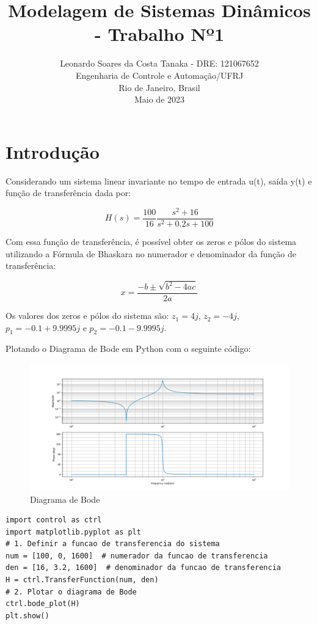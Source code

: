 \documentclass[10pt]{article}
\title{Modelagem de Sistemas Dinâmicos - Trabalho Nº1}
\author{
    Leonardo Soares da Costa Tanaka - DRE: 121067652 \\
    Engenharia de Controle e Automação/UFRJ \\
    Rio de Janeiro, Brasil \\
    Maio de 2023
}
\date{}
\begin{document}
\maketitle
\thispagestyle{capa}

\section{Introdução}

\quad Considerando um sistema linear invariante no tempo de entrada u(t), saída y(t) e 
função de transferência dada por:

\begin{equation}
    H(s) = \frac{100}{16} \frac{s^2 + 16}{s^2 + 0.2s + 100}
\end{equation}

\quad Com essa função de transferência,
é possível obter os zeros e pólos do sistema utilizando a Fórmula de Bhaskara no numerador e denominador da função de transferência:

\begin{equation}
    x = \frac{-b \pm \sqrt{b^2 - 4ac}}{2a}
\end{equation}

\quad Os valores dos zeros e pólos do sistema são:
$z_1 = 4j$, $z_2 = -4j$, $p_1 = -0.1 + 9.9995j$ e $p_2 = -0.1 - 9.9995j$.

\quad Plotando o Diagrama de Bode em Python com o seguinte código:

\begin{figure}[h]
    \centering
    \includegraphics[scale=0.4]{bode.png}
    \caption{Diagrama de Bode}
\end{figure}

\begin{lstlisting}
import control as ctrl
import matplotlib.pyplot as plt
# 1. Definir a funcao de transferencia do sistema
num = [100, 0, 1600]  # numerador da funcao de transferencia
den = [16, 3.2, 1600]  # denominador da funcao de transferencia
H = ctrl.TransferFunction(num, den)
# 2. Plotar o diagrama de Bode
ctrl.bode_plot(H)
plt.show()    
\end{lstlisting}
\end{document}
